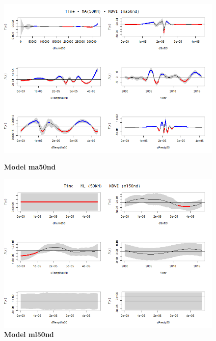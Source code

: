 \begin{figure}[H]

    \begin{minipage}{0.8\textwidth}
        \centering
        \includegraphics[width=1.2\textwidth]{ma50nd.png} %
        \caption{\textbf{Model ma50nd}}
    \end{minipage}\hfill
    \begin{minipage}{0.8\textwidth}
        \centering
        \includegraphics[width=1.2\textwidth]{ml50nd.png} %
        \caption{\textbf{Model ml50nd}}
    \end{minipage}
\end{figure}

